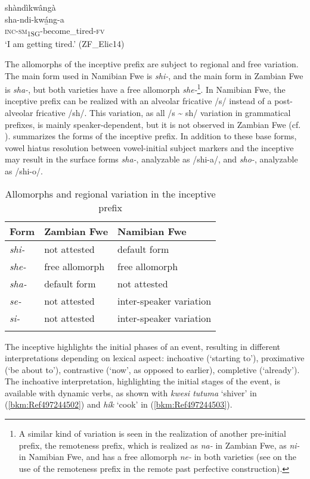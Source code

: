 \ea
\label{bkm:Ref99100091}
\glll shàndìkwângà\\
sha-ndi-kwá̲ng-a\\
\textsc{inc}-\textsc{sm}\textsubscript{1SG}-become\_tired-\textsc{fv}\\
\glt ‘I am getting tired.’ (ZF\_Elic14)
\z

The allomorphs of the inceptive prefix are subject to regional and free variation. The main form used in Namibian Fwe is \textit{shi-}, and the main form in Zambian Fwe is \textit{sha-}, but both varieties have a free allomorph \textit{she-}\footnote{A similar kind of variation is seen in the realization of another pre-initial prefix, the remoteness prefix, which is realized as \textit{na-} in Zambian Fwe, as \textit{ni-} in Namibian Fwe, and has a free allomorph \textit{ne-} in both varieties (see  on the use of the remoteness prefix in the remote past perfective construction).}. In Namibian Fwe, the inceptive prefix can be realized with an alveolar fricative /s/ instead of a post-alveolar fricative /sh/. This variation, as all /s {\textasciitilde} sh/ variation in grammatical prefixes, is mainly speaker-dependent, but it is not observed in Zambian Fwe (cf. ).  summarizes the forms of the inceptive prefix. In addition to these base forms, vowel hiatus resolution between vowel-initial subject markers and the inceptive may result in the surface forms \textit{sha-}, analyzable as /shi-a/, and \textit{sho-}, analyzable as /shi-o/.

\begin{table}
\label{bkm:Ref490241419}\caption{\label{tab:9:8}Allomorphs and regional variation in the inceptive prefix}
\begin{tabular}{lll}
\lsptoprule
Form & Zambian Fwe & Namibian Fwe\\
\midrule
{\itshape shi-}  & not attested & default form\\
{\itshape she-} & free allomorph & free allomorph\\
{\itshape sha-} & default form & not attested\\
{\itshape se-} & not attested & inter-speaker variation\\
{\itshape si-} & not attested & inter-speaker variation\\
\lspbottomrule
\end{tabular}
\end{table}

The inceptive highlights the initial phases of an event, resulting in different interpretations depending on lexical aspect: inchoative (‘starting to’), proximative (‘be about to’), contrastive (‘now’, as opposed to earlier), completive (‘already’). The inchoative interpretation, highlighting the initial stages of the event, is available with dynamic verbs, as shown with \textit{kwesi tutuma} ‘shiver’ in (\ref{bkm:Ref497244502}) and \textit{hík} ‘cook’ in (\ref{bkm:Ref497244503}).

